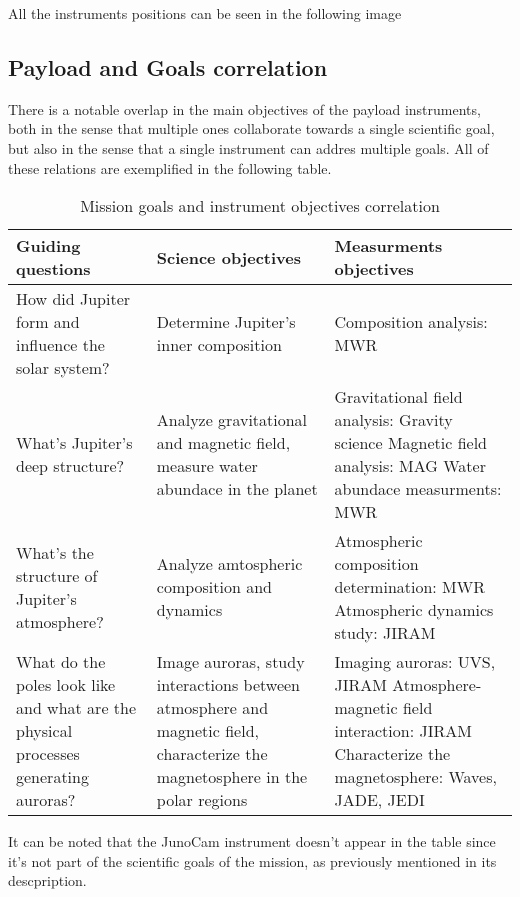 All the instruments positions can be seen in the following image

\subsection{Payload and Goals correlation}
There is a notable overlap in the main objectives of the payload instruments, both in the sense that multiple ones collaborate towards a single scientific goal, but also in the sense that a single instrument can addres multiple goals. All of these relations are exemplified in the following table.

\begin{table}[H]
    \renewcommand{\arraystretch}{1.5}
    \centering
    \begin{tabularx}{\linewidth}{|X|X|X|}
        \hline
        \textbf{Guiding questions} & \textbf{Science objectives} & \textbf{Measurments objectives} \\
        \hline
        \hline
        How did Jupiter form and influence the solar system? & Determine Jupiter's inner composition & Composition analysis: MWR \\ 
        \hline
        What's Jupiter's deep structure? & Analyze gravitational and magnetic field, measure water abundace in the planet & Gravitational field analysis: Gravity science \newline Magnetic field analysis: MAG \newline Water abundace measurments: MWR \\
        \hline
        What's the structure of Jupiter's atmosphere? & Analyze amtospheric composition and dynamics  & Atmospheric composition determination: MWR \newline Atmospheric dynamics study: JIRAM \\
        \hline
        What do the poles look like and what are the physical processes generating auroras? & Image auroras, study interactions between atmosphere and magnetic field, characterize the magnetosphere in the polar regions & Imaging auroras: UVS, JIRAM \newline Atmosphere-magnetic field interaction: JIRAM \newline Characterize the magnetosphere: Waves, JADE, JEDI \\
        \hline
    \end{tabularx}
    \caption{Mission goals and instrument objectives correlation}
\end{table}
It can be noted that the JunoCam instrument doesn't appear in the table since it's not part of the scientific goals of the mission, as previously mentioned in its descpription.  

